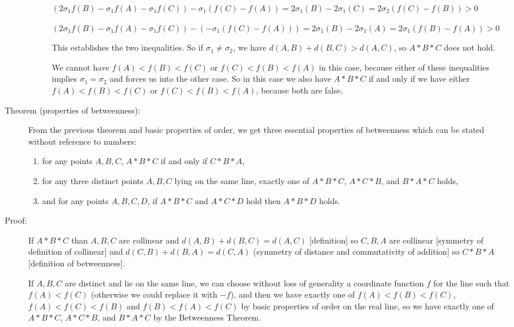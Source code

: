 \documentclass[12pt]{article}
\begin{document}
\begin{description}
\begin{description}
$(2\sigma_1f(B) - \sigma_1f(A) - \sigma_1f(C)) - \sigma_1(f(C)-f(A)) = 2\sigma_1(B) - 2 \sigma_1(C) = 2\sigma_2(f(C)-f(B)) >0$

$(2\sigma_1f(B) - \sigma_1f(A) - \sigma_1f(C)) - (-\sigma_1(f(C)-f(A))) = 2\sigma_1(B) - 2 \sigma_1(A) = 2\sigma_1(f(B)-f(A)) >0$

This establishes the two inequalities.  So if $\sigma_1 \neq \sigma_2$, we have $d(A,B)+d(B,C)>d(A,C)$, so $A*B*C$ does not hold.

We cannot have $f(A) < f(B) < f(C)$ or $f(C)<f(B)<f(A)$ in this case, because either of these inequalities implies $\sigma_1 = \sigma_2$ and forces us into the other case.  So in this case we also have $A*B*C$  if and only if
we have either $f(A) < f(B) < f(C)$ or $f(C)<f(B)<f(A)$, because both are false.
\end{description}

\item[Theorem (properties of betweenness):]  From the previous theorem and basic properties of order, we get three essential properties of betweenness which can be stated without reference to numbers: 
\begin{enumerate}

\item  for any points $A,B,C$, $A*B*C$ if and only if $C*B*A$, 

\item  for any three distinct points $A,B,C$ lying on the same line, exactly one of $A*B*C$, $A*C*B$, and $B*A*C$ holds, 

\item and for any points $A,B,C,D$, if  $A*B*C$ and $A*C*D$ hold then $A*B*D$ holds.

\end{enumerate}

\item[Proof:]  If $A*B*C$ than $A,B,C$ are collinear and $d(A,B)+d(B,C) = d(A,C)$ [definition] so $C,B,A$ are collinear [symmetry of definition of collinear] and $d(C,B) + d(B,A) = d(C,A)$ (symmetry of distance and commutativity of addition] so $C*B*A$ [definition of betweenness].

If $A,B,C$ are distinct and lie on the same line, we can choose without loss of generality a coordinate function $f$ for the line
such that $f(A) < f(C)$ (otherwise we could replace it with $-f$), and then we have exactly one of $f(A)<f(B)<f(C)$, $f(A)<f(C)<f(B)$
and $f(B)<f(A)<f(C)$ by basic properties of order on the real line, so we have exactly one of $A*B*C$, $A*C*B$, and $B*A*C$ by the Betweenness Theorem.


\end{description}
\end{document}
